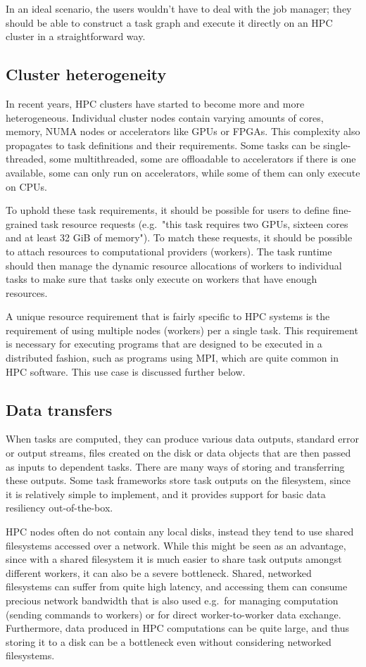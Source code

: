 In an ideal scenario, the users wouldn't have to deal with the job manager; they should be
able to construct a task graph and execute it directly on an HPC cluster in a straightforward way.

\subsection{Cluster heterogeneity}
In recent years, HPC clusters have started to become more and more heterogeneous. Individual
cluster nodes contain varying amounts of cores, memory, NUMA nodes or accelerators like GPUs or
FPGAs. This complexity also propagates to task definitions and their requirements. Some tasks
can be single-threaded, some multithreaded, some are offloadable to accelerators if there is one
available, some can only run on accelerators, while some of them can only execute on CPUs.

To uphold these task requirements, it should be possible for users to define fine-grained
task resource requests (e.g.\ "this task requires two GPUs, sixteen cores and at least 32 GiB of
memory"). To match these requests, it should be possible to attach resources to computational
providers (workers). The task runtime should then manage the dynamic resource allocations of
workers to individual tasks to make sure that tasks only execute on workers that have enough
resources.

A unique resource requirement that is fairly specific to HPC systems is the requirement of using
multiple nodes (workers) per a single task. This requirement is necessary for executing programs
that are designed to be executed in a distributed fashion, such as programs using MPI, which are
quite common in HPC software. This use case is discussed further below.

\subsection{Data transfers}
When tasks are computed, they can produce various data outputs, standard error or output streams,
files created on the disk or data objects that are then passed as inputs to dependent tasks.
There are many ways of storing and transferring these outputs. Some task frameworks store task
outputs on the filesystem, since it is relatively simple to implement, and it provides support for
basic data resiliency out-of-the-box.

HPC nodes often do not contain any local disks, instead they tend to use shared filesystems
accessed over a network. While this might be seen as an advantage, since with a shared filesystem
it is much easier to share task outputs amongst different workers, it can also be a severe
bottleneck. Shared, networked filesystems can suffer from quite high latency, and accessing them
can consume precious network bandwidth that is also used e.g.\ for managing computation
(sending commands to workers) or for direct worker-to-worker data exchange.
Furthermore, data produced in HPC computations can be quite large, and thus storing it to a disk
can be a bottleneck even without considering networked filesystems.

